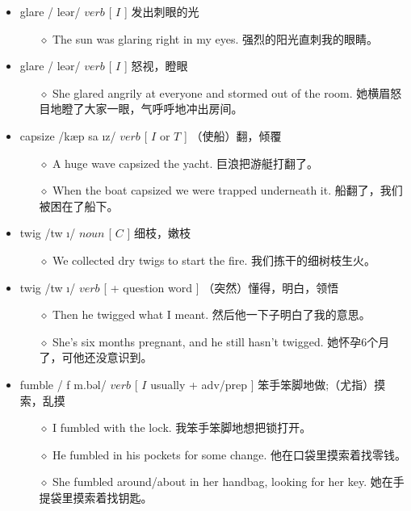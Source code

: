 \documentclass[a4paper,top=2.5cm,buttom=2.5cm10.5pt]{book}
\begin{document}
\begin{itemize}
\item glare / \textscriptg leər/ $ verb $ [  $ I $  ] 发出刺眼的光
\begin{itemize}
\item[$\diamond$] The sun was glaring right in my eyes.
强烈的阳光直刺我的眼睛。
\end{itemize}
\end{itemize}
\begin{itemize}
\item glare / \textscriptg leər/ $ verb $ [  $ I $  ] 怒视，瞪眼
\begin{itemize}
\item[$\diamond$] She glared angrily at everyone and stormed out of the room.
她横眉怒目地瞪了大家一眼，气呼呼地冲出房间。
\end{itemize}
\end{itemize}
\begin{itemize}
\item capsize /kæp \textprimstress sa \i z/ $ verb $ [  $ I $  or  $ T $  ] （使船）翻，倾覆
\begin{itemize}
\item[$\diamond$] A huge wave capsized the yacht.
巨浪把游艇打翻了。
\item[$\diamond$] When the boat capsized we were trapped underneath it.
船翻了，我们被困在了船下。
\end{itemize}
\end{itemize}
\begin{itemize}
\item twig /tw \i  \textscriptg / $ noun $ [  $ C $  ] 细枝，嫩枝
\begin{itemize}
\item[$\diamond$] We collected dry twigs to start the fire.
我们拣干的细树枝生火。
\end{itemize}
\end{itemize}
\begin{itemize}
\item twig /tw \i  \textscriptg / $ verb $ [ + question word ] （突然）懂得，明白，领悟
\begin{itemize}
\item[$\diamond$] Then he twigged what I meant.
然后他一下子明白了我的意思。
\item[$\diamond$] She's six months pregnant, and he still hasn't twigged.
她怀孕6个月了，可他还没意识到。
\end{itemize}
\end{itemize}
\begin{itemize}
\item fumble / \textprimstress f \textturnv m.bəl/ $ verb $ [  $ I $  usually + adv/prep ] 笨手笨脚地做;（尤指）摸索，乱摸
\begin{itemize}
\item[$\diamond$] I fumbled with the lock.
我笨手笨脚地想把锁打开。
\item[$\diamond$] He fumbled in his pockets for some change.
他在口袋里摸索着找零钱。
\item[$\diamond$] She fumbled around/about in her handbag, looking for her key.
她在手提袋里摸索着找钥匙。
\end{itemize}
\end{itemize}
\end{document}
